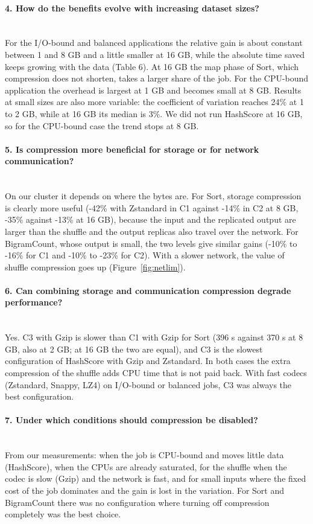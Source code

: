 \documentclass[11pt,a4paper]{article}
\begin{document}
\paragraph{4. How do the benefits evolve with increasing dataset sizes?}\mbox{}\\
For the I/O-bound and balanced applications the relative gain is about constant between 1 and 8 GB and a little smaller at 16 GB, while the absolute time saved keeps growing with the data (Table 6). At 16 GB the map phase of Sort, which compression does not shorten, takes a larger share of the job. For the CPU-bound application the overhead is largest at 1 GB and becomes small at 8 GB. Results at small sizes are also more variable: the coefficient of variation reaches 24\% at 1 to 2 GB, while at 16 GB its median is 3\%. We did not run HashScore at 16 GB, so for the CPU-bound case the trend stops at 8 GB.

\paragraph{5. Is compression more beneficial for storage or for network communication?}\mbox{}\\
On our cluster it depends on where the bytes are. For Sort, storage compression is clearly more useful (-42\% with Zstandard in C1 against -14\% in C2 at 8 GB, -35\% against -13\% at 16 GB), because the input and the replicated output are larger than the shuffle and the output replicas also travel over the network. For BigramCount, whose output is small, the two levels give similar gains (-10\% to -16\% for C1 and -10\% to -23\% for C2). With a slower network, the value of shuffle compression goes up (Figure~\ref{fig:netlim}).

\paragraph{6. Can combining storage and communication compression degrade performance?}\mbox{}\\
Yes. C3 with Gzip is slower than C1 with Gzip for Sort (396 s against 370 s at 8 GB, also at 2 GB; at 16 GB the two are equal), and C3 is the slowest configuration of HashScore with Gzip and Zstandard. In both cases the extra compression of the shuffle adds CPU time that is not paid back. With fast codecs (Zstandard, Snappy, LZ4) on I/O-bound or balanced jobs, C3 was always the best configuration.

\paragraph{7. Under which conditions should compression be disabled?}\mbox{}\\
From our measurements: when the job is CPU-bound and moves little data (HashScore), when the CPUs are already saturated, for the shuffle when the codec is slow (Gzip) and the network is fast, and for small inputs where the fixed cost of the job dominates and the gain is lost in the variation. For Sort and BigramCount there was no configuration where turning off compression completely was the best choice.
\end{document}
